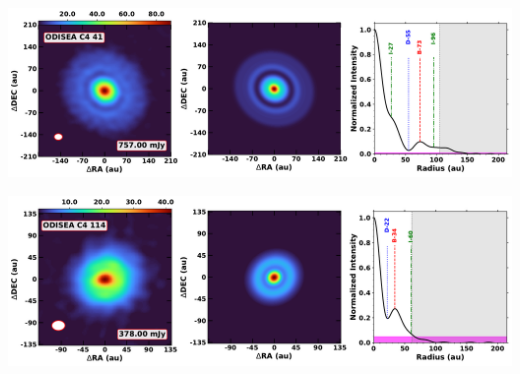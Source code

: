 \noindent
\begin{minipage}{.49\textwidth}
	 \centering
	 	 \hrulesep
	 	 \includegraphics[width=1\linewidth]{pdf/3+II/097_odisea_c4_41_cutout.pdf}
\end{minipage}%
\vrulesep
\begin{minipage}{.49\textwidth}
	 \centering
	 	 \hrulesep
	 	 \includegraphics[width=1\linewidth]{pdf/3+II/091_odisea_c4_114_cutout.pdf}
\end{minipage}%
\vspace{0.8cm}